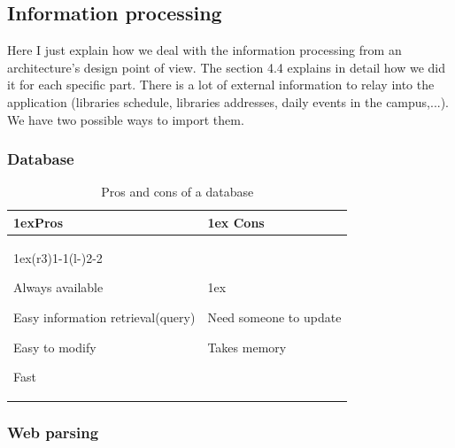 \documentclass[11pt, a4paper]{report}
\begin{document}
\subsection{Information processing}

Here I just explain how we deal with the information processing from an architecture's design point of view. The section 4.4 explains in detail how we did it for each specific part.
There is a lot of external information to relay into the application (libraries schedule, libraries addresses, daily events in the campus,...). We have two possible ways to import them.

\subsubsection{Database}

\begin{table}[H]
\begin{tabularx}{\linewidth}{>{\parskip1ex}X@{\kern4\tabcolsep}>{\parskip1ex}X}
\toprule
\hfil\bfseries Pros
&
\hfil\bfseries Cons
\\\cmidrule(r{3\tabcolsep}){1-1}\cmidrule(l{-\tabcolsep}){2-2}

Always available\par
Easy information retrieval(query)\par
Easy to modify\par
Fast\par

&

Need someone to update\par
Takes memory \par


\\\bottomrule
\end{tabularx}
\caption{Pros and cons of a database}
\end{table}

\subsubsection{Web parsing}
\end{document}
